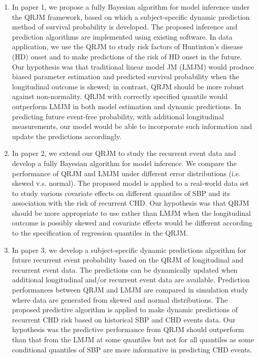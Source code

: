 \begin{enumerate}
\item In paper 1, we propose a fully Bayesian algorithm for model inference under the QRJM framework, based on which a subject-specific dynamic prediction method of survival probability is developed. The proposed inference and prediction algorithms are implemented using existing software. In data application, we use the QRJM to study risk factors of Huntinton's disease (HD) onset and to make predictions of the risk of HD onset in the future. Our hypothesis was that traditional linear model JM (LMJM) would produce biased parameter estimation and predicted survival probability when the longitudinal outcome is skewed; in contrast, QRJM should be more robust against non-normality. QRJM with correctly specified quantile would outperform LMJM in both model estimation and dynamic predictions. In predicting future event-free probability, with additional longitudinal measurements, our model would be able to incorporate such information and update the predictions accordingly.

\item In paper 2, we extend our QRJM to study the recurrent event data and develop a fully Bayesian algorithm for model inference. We compare the performance of QRJM and LMJM under different error distributions (i.e. skewed v.s. normal). The proposed model is applied to a real-world data set to study various covariate effects on different quantiles of SBP and its association with the risk of recurrent CHD. Our hypothesis was that QRJM should be more appropriate to use rather than LMJM when the longitudinal outcome is possibly skewed and covariate effects would be different according to the specification of regression quantiles in the QRJM.

\item In paper 3, we develop a subject-specific dynamic predictions algorithm for future recurrent event probability based on the QRJM of longitudinal and recurrent event data. The predictions can be dynamically updated when additional longitudinal and/or recurrent event data are available. Prediction performances between QRJM and LMJM are compared in simulation study where data are generated from skewed and normal distributions. The proposed predictive algorithm is applied to make dynamic predictions of recurrent CHD risk based on historical SBP and CHD events data. Our hypothesis was the predictive performance from QRJM should outperform than that from the LMJM at some quantiles but not for all quantiles as some conditional quantiles of SBP are more informative in predicting CHD events.
\end{enumerate}


